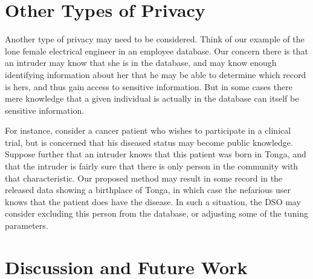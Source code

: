 \documentclass[11pt]{article}
\begin{document}




\section{Other Types of Privacy}

Another type of privacy may need to be considered.  Think of our example
of the lone female electrical engineer in an employee database.  Our
concern there is that an intruder may know that she is in the database,
and may know enough identifying information about her that he may be
able to determine which record is hers, and thus gain access to
sensitive information.  But in some cases there mere knowledge that a
given individual is actually in the database can itself be sensitive
information.

For instance, consider a cancer patient who wishes to participate in a
clinical trial, but is concerned that his diseased status may become
public knowledge.  Suppose further that an intruder knows that this
patient was born in Tonga, and that the intruder is fairly sure that
there is only person in the community with that characteristic.  Our
proposed method may result in some record in the released data showing a
birthplace of Tonga, in which case the nefarious user knows that the
patient does have the disease.  In such a situation, the DSO may
consider excluding this person from the database, or adjusting some of
the tuning parameters.

\section{Discussion and Future Work}
\end{document}
